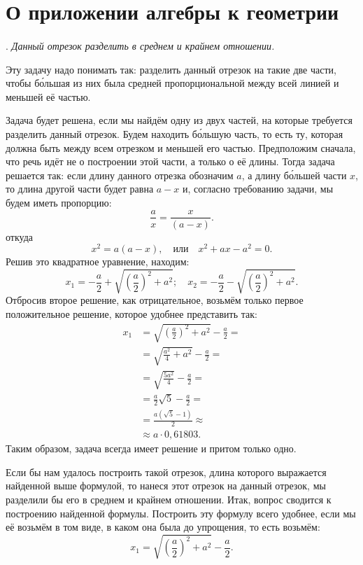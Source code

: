 \documentclass[oneside]{book}
\begin{document}
\section{О приложении алгебры к геометрии}

\paragraph{}\label{1938/209}
.
\emph{Данный отрезок разделить в среднем и крайнем отношении.}

Эту задачу надо понимать так:
разделить данный отрезок на такие две части, чтобы б\'{о}льшая из них была средней пропорциональной между всей линией и меньшей её частью.

Задача будет решена, если мы найдём одну из двух частей, на которые требуется разделить данный отрезок.
Будем находить б\'{о}льшую часть, то есть ту, которая должна быть  между всем отрезком и меньшей его частью.
Предположим сначала, что речь идёт не о построении этой части, а только о  её длины.
Тогда задача решается  так:
если длину данного отрезка обозначим $a$, а длину б\'{о}льшей части $x$, то длина другой части будет равна $a-x$ и, согласно требованию задачи, мы будем иметь пропорцию:
\[\frac ax=\frac x{(a-x)}.\]
откуда
\[x^2=a(a-x),
\quad\text{или}\quad
x^2+ax-a^2=0.\]
Решив это квадратное уравнение, находим:
\[
x_1=-\frac a2 + \sqrt{\left(\frac a2\right)^2+a^2};
\quad
x_2=-\frac a2 - \sqrt{\left(\frac a2\right)^2+a^2}.
\]
Отбросив второе решение, как отрицательное, возьмём только первое положительное решение, которое удобнее представить так:
\begin{align*}
x_1&= \sqrt{\left(\frac a2\right)^2+a^2}-\frac a2 =
\\
&= \sqrt{\frac {a^2}4+a^2}-\frac a2 =
\\
&= \sqrt{\frac {5a^2}4}-\frac a2 =
\\
&= \frac a2\sqrt{5}-\frac a2 =
\\
&= \frac {a(\sqrt{5}-1)}2 \approx
\\
&\approx a\cdot 0{,}61803.
\end{align*}
Таким образом, задача всегда имеет решение и притом только одно.

Если бы нам удалось построить такой отрезок, длина которого выражается найденной выше формулой, то нанеся этот отрезок на данный отрезок, мы разделили бы его в среднем и крайнем отношении.
Итак, вопрос сводится к построению найденной формулы.
Построить эту формулу всего удобнее, если мы её возьмём в том виде, в каком она была до упрощения, то есть возьмём:
\[x_1= \sqrt{\left(\frac a2\right)^2+a^2}-\frac a2.\]
\end{document}
